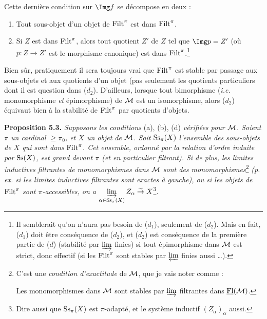 Cette dernière condition sur $\Img f$ se décompose en deux :

\begin{enumerate}[nosep]
\item[$d_1$)] Tout sous-objet d'un objet de $\mathrm{Filt}^{\pi}$ est dans $\mathrm{Filt}^{\pi}$.
\item[$d_2$)] Si $Z$ est dans $\mathrm{Filt}^{\pi}$, alors tout quotient $Z'$ de $Z$ tel que $\Img p = Z'$ (où $p : Z \longrightarrow Z'$ est le morphisme canonique) est dans $\mathrm{Filt}^{\pi}$.\footnote[17]{Il semblerait qu'on n'aura pas besoin de ($d_1$), seulement de ($d_2$). Mais en fait, ($d_1$) doit être conséquence de ($d_2$), et ($d_2$) est conséquence de la première partie de ($d$) (stabilité par $\varinjlim$ finies) si tout épimorphisme dans $\mathcal{M}$ est strict, donc effectif (si les $\mathrm{Filt}^{\pi}$ sont stables par $\varprojlim$ finies aussi \ldots).}
\end{enumerate}


Bien sûr, pratiquement il sera toujours vrai que $\mathrm{Filt}^{\pi}$ est stable par passage aux sous-objets et aux quotients d'un objet (pas seulement les quotients particuliers dont il est question dans ($d_2$). %
D'ailleurs, lorsque tout bimorphisme (\textit{i.e.} monomorphisme \textit{et} épimorphisme) de $\mathcal{M}$ est un isomorphisme, alors ($d_2$) équivaut bien à la stabilité de $\mathrm{Filt}^{\pi}$ par quotients d'objets.

\textbf{Proposition 5.3.} \textit{Supposons les conditions} (a), (b), (d) \textit{vérifiées pour $\mathcal{M}$. Soient $\pi$ un cardinal $\geq \pi_0$, et $X$ un objet de $\mathcal{M}$. Soit} $\mathrm{Ss}_{\pi}(X)$ \textit{l'ensemble des sous-objets de $X$ qui sont dans} $\mathrm{Filt}^{\pi}$\textit{. Cet ensemble, ordonné par la relation d'ordre induite par} $\mathrm{Ss}(X)$\textit{, est grand devant $\pi$ (et en particulier filtrant). Si de plus, les limites inductives filtrantes de monomorphismes dans $\mathcal{M}$ sont des monomorphismes}\footnote[18]{C'est une \textit{condition d'exactitude} de $\mathcal{M}$, que je vais noter comme :\par
\noindent{}\quad Les monomorphismes dans $\mathcal{M}$ sont stables par $\varinjlim$ filtrantes dans $\underline{\mathrm{Fl}}(\mathcal{M})$.} \textit{(p. ex. si les limites inductives filtrantes sont exactes à gauche), ou si les objets de} $\mathrm{Filt}^{\pi}$ \textit{sont $\pi$-accessibles, on a $\varinjlim\limits_{\alpha\in\mathrm{Ss}_{\pi}(X)} Z_{\alpha} \overset{\sim}{\to} X$}\footnote[19]{Dire aussi que $\mathrm{Ss}_{\pi}(X)$ est $\pi$-adapté, et le système inductif $(Z_{\alpha})_{\alpha}$ aussi.}.

